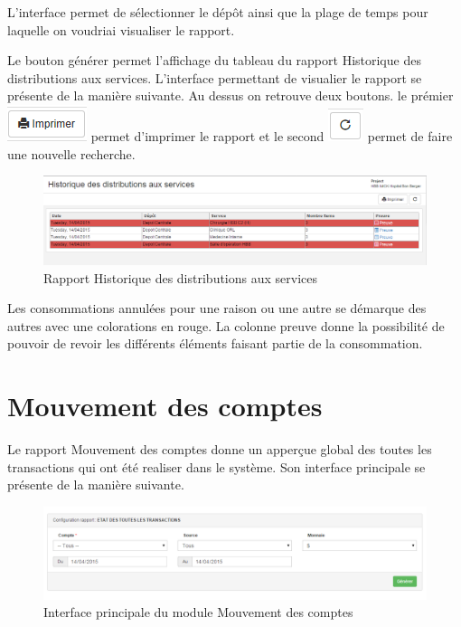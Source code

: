 \documentclass[12pt,a4paper]{report}
\begin{document}
L'interface permet de sélectionner le dépôt ainsi que la plage de temps pour laquelle on voudriai visualiser le rapport. 

Le bouton générer permet l'affichage du tableau du rapport Historique des distributions aux services.
L'interface permettant de visualier le rapport se présente de la manière suivante. Au dessus on retrouve deux boutons. le prémier 
\includegraphics[scale=0.7]{pic/Print.png} permet d'imprimer le rapport et le second \includegraphics[scale=0.7]{pic/refresh.png} permet de faire une nouvelle recherche.

\begin{figure}[h]
\begin{center}
\includegraphics[width=14cm]{pic/tabHistDistServices.png}
\end{center}
\caption{Rapport Historique des distributions aux services}
\label{Rapport Historique des distributions aux services}
\end{figure}

Les consommations annulées pour une raison ou une autre se démarque des autres avec une colorations en rouge. La colonne preuve donne la possibilité de pouvoir de revoir les différents éléments faisant partie de la consommation.


\newpage
\section{Mouvement des comptes}
Le rapport Mouvement des comptes donne un apperçue global des toutes les transactions qui ont été realiser dans le système. Son interface principale se présente de la manière suivante. 

\begin{figure}[h]
\begin{center}
\includegraphics[width=14cm]{pic/AllTransaction.png}
\end{center}
\caption{Interface principale du module Mouvement des comptes}
\label{Interface principale du module Mouvement des comptes}
\end{figure}
\end{document}
